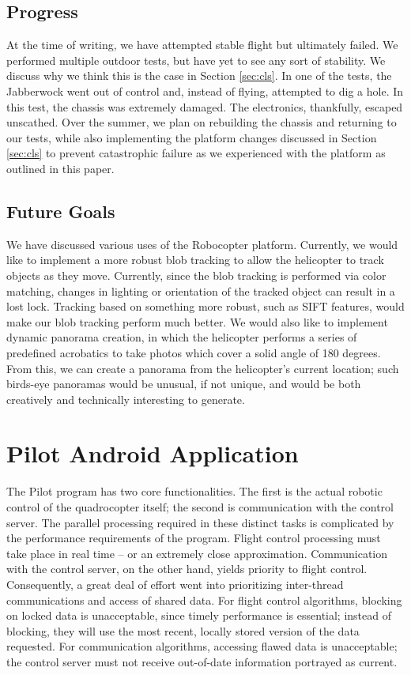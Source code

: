 \subsection{Progress}
At the time of writing, we have attempted stable flight but ultimately
failed. We performed multiple outdoor tests, but have yet to see any
sort of stability. We discuss why we think this is the case in Section
\ref{sec:cls}. In one of the tests, the Jabberwock went out of control
and, instead of flying, attempted to dig a hole. In this test, the
chassis was extremely damaged. The electronics, thankfully, escaped
unscathed. Over the summer, we plan on rebuilding the chassis and
returning to our tests, while also implementing the platform changes
discussed in Section \ref{sec:cls} to prevent catastrophic failure as
we experienced with the platform as outlined in this paper.

\subsection{Future Goals}
We have discussed various uses of the Robocopter platform. Currently,
we would like to implement a more robust blob tracking to allow the
helicopter to track objects as they move. Currently, since the blob
tracking is performed via color matching, changes in lighting or
orientation of the tracked object can result in a lost lock. Tracking
based on something more robust, such as SIFT features, would make our
blob tracking perform much better.  We would also like to implement
dynamic panorama creation, in which the helicopter performs a series
of predefined acrobatics to take photos which cover a solid angle of
180 degrees. From this, we can create a panorama from the helicopter's
current location; such birds-eye panoramas would be unusual, if not
unique, and would be both creatively and technically interesting to
generate.

\section{Pilot Android Application}
\label{sec:pilot}
The Pilot program has two core functionalities.‭ ‬The first is the
actual robotic control of the quadrocopter itself‭; ‬the second is
communication with the control server.‭ ‬The parallel processing
required in these distinct tasks is complicated by the performance
requirements of the program.‭ ‬Flight control processing must take place
in real time -- or an extremely close approximation.‭ ‬Communication
with the control server, on the other hand, yields priority to flight
control.‭ ‬Consequently,‭ ‬a great deal of effort went into prioritizing
inter-thread communications and access of shared data.‭ ‬For flight
control algorithms,‭ ‬blocking on locked data is unacceptable,‭ ‬since
timely performance is essential‭; ‬instead of blocking,‭ ‬they will use
the most recent,‭ ‬locally stored version of the data requested.‭ ‬For
communication algorithms,‭ ‬accessing flawed data is unacceptable‭; ‬the
control server must not receive out-of-date information portrayed as
current.

